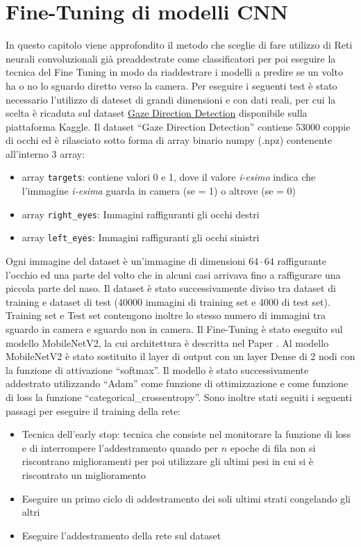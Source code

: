 \documentclass[12pt,a4paper,openright,twoside]{book}
\begin{document}
\section{Fine-Tuning di modelli CNN}
In questo capitolo viene approfondito il metodo che sceglie di fare utilizzo di Reti neurali convoluzionali già preaddestrate come classificatori per poi eseguire la tecnica del Fine Tuning in modo da riaddestrare i modelli a predire se un volto ha o no lo sguardo diretto verso la camera.
Per eseguire i seguenti test è stato necessario l'utilizzo di dateset di grandi dimensioni e con dati reali, per cui la scelta è ricaduta sul dataset \href{https://www.kaggle.com/datasets/estopadilla/gaze-direction-detection}{Gaze Direction Detection} disponibile sulla piattaforma Kaggle.
Il dataset ``Gaze Direction Detection'' contiene 53000 coppie di occhi ed è rilasciato sotto forma di array binario numpy (.npz) contenente all'interno 3 array: \begin{itemize}
    \item array \texttt{targets}: contiene valori 0 e 1, dove il valore \textit{i-esimo} indica che l'immagine \textit{i-esima} guarda in camera (se = 1) o altrove (se = 0)
    \item array \texttt{right\_eyes}: Immagini raffiguranti gli occhi destri
    \item array \texttt{left\_eyes}: Immagini raffiguranti gli occhi sinistri
\end{itemize}
Ogni immagine del dataset è un'immagine di dimensioni \(64 \cdot 64\) raffigurante l'occhio ed una parte del volto che in alcuni casi arrivava fino a raffigurare una piccola parte del naso.
Il dataset è stato successivamente diviso tra dataset di training e dataset di test (40000 immagini di training set e 4000 di test set).
Training set e Test set contengono inoltre lo stesso numero di immagini tra sguardo in camera e sguardo non in camera.
Il Fine-Tuning è stato eseguito sul modello MobileNetV2, la cui architettura è descritta nel Paper \cite[MobileNetV2: Inverted Residuals and Linear Bottlenecks]{Sandler2018MobileNetV2IR}.
Al modello MobileNetV2 è stato sostituito il layer di output con un layer Dense di 2 nodi con la funzione di attivazione ``softmax''. Il modello è stato successivamente addestrato utilizzando ``Adam'' come funzione di ottimizzazione e come funzione di loss la funzione ``categorical\_crossentropy''.
Sono inoltre stati seguiti i seguenti passagi per eseguire il training della rete: \begin{itemize}
    \item Tecnica dell'early stop: tecnica che consiste nel monitorare la funzione di loss e di interrompere l'addestramento quando per \(n\) epoche di fila non si riscontrano miglioramenti per poi utilizzare gli ultimi pesi in cui si è riscontrato un miglioramento
    \item Eseguire un primo ciclo di addestramento dei soli ultimi strati congelando gli altri
    \item Eseguire l'addestramento della rete sul dataset
\end{itemize}
\end{document}
